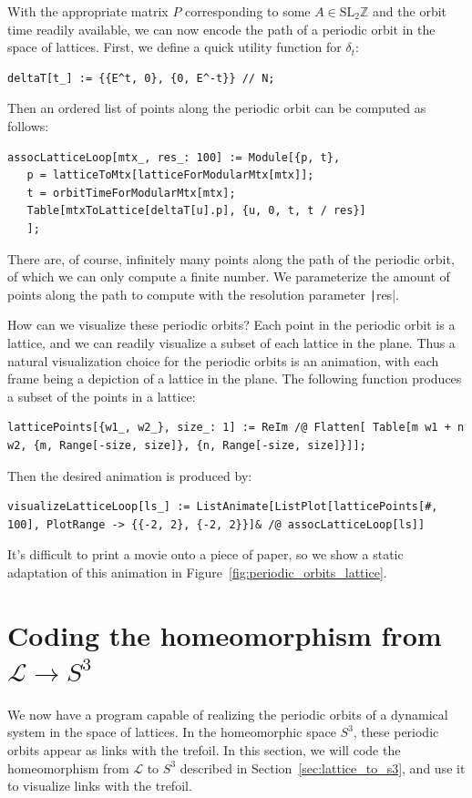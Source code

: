 \documentclass[12pt,twoside]{reedthesis}
\theoremstyle{definition}
\newcommand{\Z}{\mathbb{Z}}
\newcommand{\LS}{\mathcal{L}}
\newcommand{\SLZ}{\mathrm{SL}_2{\Z}}
\begin{document}
With the appropriate matrix $P$ corresponding to some $A \in \SLZ$ and the orbit time readily available, we can now encode the path of a periodic orbit in the space of lattices.
First, we define a quick utility function for $\delta_t$:
\begin{verbatim}
deltaT[t_] := {{E^t, 0}, {0, E^-t}} // N;
\end{verbatim}
Then an ordered list of points along the periodic orbit can be computed as follows:
\begin{verbatim}
assocLatticeLoop[mtx_, res_: 100] := Module[{p, t},
   p = latticeToMtx[latticeForModularMtx[mtx]];
   t = orbitTimeForModularMtx[mtx];
   Table[mtxToLattice[deltaT[u].p], {u, 0, t, t / res}]
   ];
\end{verbatim}
There are, of course, infinitely many points along the path of the periodic orbit, of which we can only compute a finite number.
We parameterize the amount of points along the path to compute with the resolution parameter \texttt|res|.

How can we visualize these periodic orbits?
Each point in the periodic orbit is a lattice, and we can readily visualize a subset of each lattice in the plane.
Thus a natural visualization choice for the periodic orbits is an animation, with each frame being a depiction of a lattice in the plane.
The following function produces a subset of the points in a lattice:
\begin{verbatim}
latticePoints[{w1_, w2_}, size_: 1] := ReIm /@ Flatten[ Table[m w1 + n w2, {m, Range[-size, size]}, {n, Range[-size, size]}]];
\end{verbatim}
Then the desired animation is produced by:
\begin{verbatim}
visualizeLatticeLoop[ls_] := ListAnimate[ListPlot[latticePoints[#, 100], PlotRange -> {{-2, 2}, {-2, 2}}]& /@ assocLatticeLoop[ls]]
\end{verbatim}
It's difficult to print a movie onto a piece of paper, so we show a static adaptation of this animation in Figure~\ref{fig:periodic_orbits_lattice}.

\section{Coding the homeomorphism from $\LS \to S^3$}

We now have a program capable of realizing the periodic orbits of a dynamical system in the space of lattices.
In the homeomorphic space $S^3$, these periodic orbits appear as links with the trefoil.
In this section, we will code the homeomorphism from $\LS$ to $S^3$ described in Section~\ref{sec:lattice_to_s3}, and use it to visualize links with the trefoil.
\end{document}
